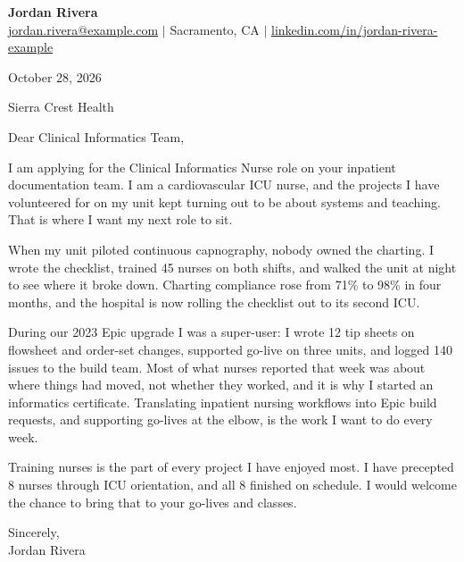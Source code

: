\documentclass[11pt, letterpaper]{article}
\begin{document}
\pagestyle{empty}

\begin{center}
  \textbf{\LARGE Jordan Rivera} \\[2pt]
  \href{mailto:jordan.rivera@example.com}{jordan.rivera@example.com} $|$ Sacramento, CA $|$ \href{https://linkedin.com/in/jordan-rivera-example}{linkedin.com/in/jordan-rivera-example}
\end{center}
\vspace{10pt}

October 28, 2026

Sierra Crest Health

Dear Clinical Informatics Team,

I am applying for the Clinical Informatics Nurse role on your inpatient documentation team. I am a cardiovascular ICU nurse, and the projects I have volunteered for on my unit kept turning out to be about systems and teaching. That is where I want my next role to sit.

When my unit piloted continuous capnography, nobody owned the charting. I wrote the checklist, trained 45 nurses on both shifts, and walked the unit at night to see where it broke down. Charting compliance rose from 71\% to 98\% in four months, and the hospital is now rolling the checklist out to its second ICU.

During our 2023 Epic upgrade I was a super-user: I wrote 12 tip sheets on flowsheet and order-set changes, supported go-live on three units, and logged 140 issues to the build team. Most of what nurses reported that week was about where things had moved, not whether they worked, and it is why I started an informatics certificate. Translating inpatient nursing workflows into Epic build requests, and supporting go-lives at the elbow, is the work I want to do every week.

Training nurses is the part of every project I have enjoyed most. I have precepted 8 nurses through ICU orientation, and all 8 finished on schedule. I would welcome the chance to bring that to your go-lives and classes.

Sincerely, \\[18pt]
Jordan Rivera
\end{document}
